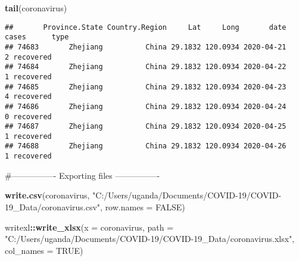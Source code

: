 \documentclass[
]{article}
\newenvironment{Shaded}{\begin{snugshade}}{\end{snugshade}}
\newcommand{\ControlFlowTok}[1]{\textcolor[rgb]{0.13,0.29,0.53}{\textbf{#1}}}
\newcommand{\DataTypeTok}[1]{\textcolor[rgb]{0.13,0.29,0.53}{#1}}
\newcommand{\DecValTok}[1]{\textcolor[rgb]{0.00,0.00,0.81}{#1}}
\newcommand{\KeywordTok}[1]{\textcolor[rgb]{0.13,0.29,0.53}{\textbf{#1}}}
\newcommand{\NormalTok}[1]{#1}
\newcommand{\OperatorTok}[1]{\textcolor[rgb]{0.81,0.36,0.00}{\textbf{#1}}}
\newcommand{\OtherTok}[1]{\textcolor[rgb]{0.56,0.35,0.01}{#1}}
\newcommand{\StringTok}[1]{\textcolor[rgb]{0.31,0.60,0.02}{#1}}
\begin{document}
\begin{Shaded}
\begin{Highlighting}[]
\KeywordTok{tail}\NormalTok{(coronavirus)}
\end{Highlighting}
\end{Shaded}

\begin{verbatim}
##       Province.State Country.Region     Lat     Long       date cases      type
## 74683       Zhejiang          China 29.1832 120.0934 2020-04-21     2 recovered
## 74684       Zhejiang          China 29.1832 120.0934 2020-04-22     1 recovered
## 74685       Zhejiang          China 29.1832 120.0934 2020-04-23     4 recovered
## 74686       Zhejiang          China 29.1832 120.0934 2020-04-24     0 recovered
## 74687       Zhejiang          China 29.1832 120.0934 2020-04-25     1 recovered
## 74688       Zhejiang          China 29.1832 120.0934 2020-04-26     1 recovered
\end{verbatim}

\begin{Shaded}
\end{Shaded}

\#---------------- Exporting files ----------------

\begin{Shaded}
\begin{Highlighting}[]
\KeywordTok{write.csv}\NormalTok{(coronavirus, }\StringTok{"C:/Users/uganda/Documents/COVID-19/COVID-19_Data/coronavirus.csv"}\NormalTok{, }\DataTypeTok{row.names =} \OtherTok{FALSE}\NormalTok{)}

\NormalTok{writexl}\OperatorTok{::}\KeywordTok{write_xlsx}\NormalTok{(}\DataTypeTok{x =}\NormalTok{ coronavirus, }\DataTypeTok{path =} \StringTok{"C:/Users/uganda/Documents/COVID-19/COVID-19_Data/coronavirus.xlsx"}\NormalTok{, }\DataTypeTok{col_names =} \OtherTok{TRUE}\NormalTok{)}
\end{Highlighting}
\end{Shaded}
\end{document}
